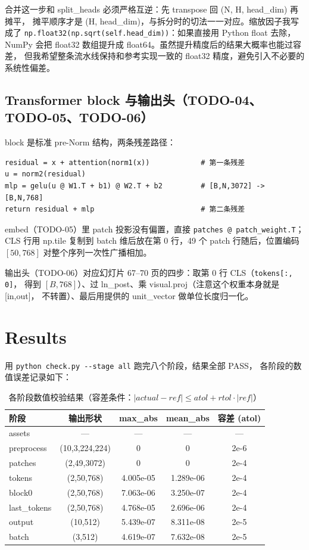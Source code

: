\documentclass[a4paper,12pt]{article}
\begin{document}
合并这一步和 split\_heads 必须严格互逆：先 transpose 回 (N, H, head\_dim) 再摊平，
摊平顺序才是 (H, head\_dim)，与拆分时的切法一一对应。缩放因子我写成了
\verb|np.float32(np.sqrt(self.head_dim))|：如果直接用 Python float 去除，
NumPy 会把 float32 数组提升成 float64。虽然提升精度后的结果大概率也能过容差，
但我希望整条流水线保持和参考实现一致的 float32 精度，避免引入不必要的系统性偏差。

\subsection{Transformer block 与输出头（TODO-04、TODO-05、TODO-06）}

block 是标准 pre-Norm 结构，两条残差路径：

\begin{verbatim}
residual = x + attention(norm1(x))            # 第一条残差
u = norm2(residual)
mlp = gelu(u @ W1.T + b1) @ W2.T + b2         # [B,N,3072] -> [B,N,768]
return residual + mlp                         # 第二条残差
\end{verbatim}

embed（TODO-05）里 patch 投影没有偏置，直接 \verb|patches @ patch_weight.T|；
CLS 行用 np.tile 复制到 batch 维后放在第 0 行，49 个 patch 行随后，位置编码
$[50,768]$ 对整个序列一次性广播相加。

输出头（TODO-06）对应幻灯片 67--70 页的四步：取第 0 行 CLS（\verb|tokens[:, 0]|，
得到 $[B,768]$）、过 ln\_post、乘 visual.proj（注意这个权重本身就是 [in,out]，
不转置）、最后用提供的 unit\_vector 做单位长度归一化。

\section{Results}

用 \verb|python check.py --stage all| 跑完八个阶段，结果全部 PASS，
各阶段的数值误差记录如下：

\begin{table}[H]
\centering
\caption{各阶段数值校验结果（容差条件：$|actual - ref| \le atol + rtol \cdot |ref|$）}
\begin{tabular}{lcccc}
\toprule
阶段 & 输出形状 & max\_abs & mean\_abs & 容差 (atol) \\
\midrule
assets       & ---            & ---        & ---        & ---   \\
preprocess   & (10,3,224,224) & 0          & 0          & 2e-6  \\
patches      & (2,49,3072)    & 0          & 0          & 2e-4  \\
tokens       & (2,50,768)     & 4.005e-05  & 1.289e-06  & 2e-4  \\
block0       & (2,50,768)     & 7.063e-06  & 3.250e-07  & 2e-4  \\
last\_tokens & (2,50,768)     & 4.768e-05  & 2.696e-06  & 2e-4  \\
output       & (10,512)       & 5.439e-07  & 8.311e-08  & 2e-5  \\
batch        & (3,512)        & 4.619e-07  & 7.632e-08  & 2e-5  \\
\bottomrule
\end{tabular}
\end{table}
\end{document}
